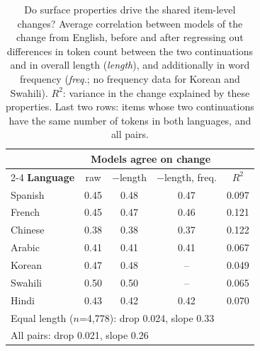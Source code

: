 \begin{table}[t]
\centering
\small
\setlength{\tabcolsep}{3.5pt}
\begin{tabular}{lcccc}
\toprule
 & \multicolumn{3}{c}{\textbf{Models agree on change}} & \\
\cmidrule(lr){2-4}
\textbf{Language} & raw & $-$length & $-$length, freq. & $R^2$ \\
\midrule
Spanish & 0.45 & 0.48 & 0.47 & 0.097 \\
French & 0.45 & 0.47 & 0.46 & 0.121 \\
Chinese & 0.38 & 0.38 & 0.37 & 0.122 \\
Arabic & 0.41 & 0.41 & 0.41 & 0.067 \\
Korean & 0.47 & 0.48 & -- & 0.049 \\
Swahili & 0.50 & 0.50 & -- & 0.065 \\
Hindi & 0.43 & 0.42 & 0.42 & 0.070 \\
\midrule
\multicolumn{5}{l}{Equal length ($n$=4,778): drop 0.024, slope 0.33} \\
\multicolumn{5}{l}{All pairs: drop 0.021, slope 0.26} \\
\bottomrule
\end{tabular}
\caption{Do surface properties drive the shared item-level changes? Average correlation between models of the change from English, before and after regressing out differences in token count between the two continuations and in overall length (\emph{length}), and additionally in word frequency (\emph{freq.}; no frequency data for Korean and Swahili). $R^2$: variance in the change explained by these properties. Last two rows: items whose two continuations have the same number of tokens in both languages, and all pairs.}
\label{tab:surface}
\end{table}
